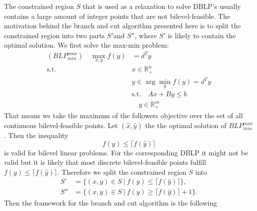 \documentclass{article}
\begin{document}
The constrained region $S$ that is used as a relaxation to solve DBLP's usually contains a large amount of integer points that are not bilevel-feasible. The motivation behind the branch and cut algorithm presented here is to split the constrained region into two parts $S'$and $S''$, where $S'$ is likely to contain the optimal solution.
We first solve the max-min problem:
	\begin{align*}
	(BLP^{max}_{min}) \quad \max_{x,y} f(y) &= d^T y \\
	\text{s.t.} \quad &x \in \mathbb{R}^n_{+} \\
	&y \in \arg \min_{y} f(y) = d^Ty \\
	&\text{s.t.} \quad Ax + By \le b \\
	& \quad y \in \mathbb{R}^m_{+}
	\end{align*}
That means we take the maximum of the followers objective over the set of all continuous bilevel-feasible points. Let $(\hat x, \hat y)$ the the optimal solution of $BLP^{max}_{min}$. Then the inequality
\begin{equation*}
	f(y) \le \lceil f(\hat y) \rceil
\end{equation*}
is valid for bilevel linear problems. For the corresponding DBLP it might not be valid but it is likely that most discrete bilevel-feasible points fulfill $f(y) \le \lceil f(\hat y) \rceil$.
Therefore we split the constrained region $S$ into 
\begin{align*}
	S' &= \{(x,y) \in S \ | \ f(y) \le \lceil f(\hat y) \rceil \}, \\
	S'' &= \{(x,y) \in S \ | \ f(y) \ge \lceil f(\hat y) \rceil + 1\}.
\end{align*}
Then the framework for the branch and cut algorithm is the following
\end{document}
